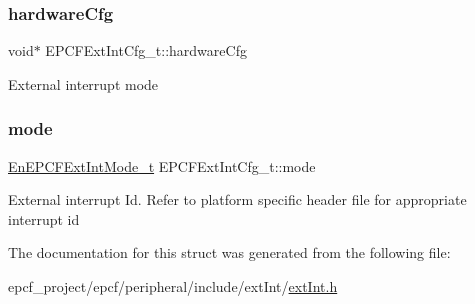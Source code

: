 \subsubsection{\texorpdfstring{hardware\+Cfg}{hardwareCfg}}
{\footnotesize\ttfamily void$\ast$ E\+P\+C\+F\+Ext\+Int\+Cfg\+\_\+t\+::hardware\+Cfg}

External interrupt mode \mbox{\label{structEPCFExtIntCfg__t_a0c4178dcdefa4b7386746928b63a586c}} 
\subsubsection{\texorpdfstring{mode}{mode}}
{\footnotesize\ttfamily \mbox{\hyperlink{extInt_8h_ad333fc40b8eb8a629c8ac27ad03b3245}{En\+E\+P\+C\+F\+Ext\+Int\+Mode\+\_\+t}} E\+P\+C\+F\+Ext\+Int\+Cfg\+\_\+t\+::mode}

External interrupt Id. Refer to platform specific header file for appropriate interrupt id 

The documentation for this struct was generated from the following file\+:\begin{DoxyCompactItemize}
\item 
epcf\+\_\+project/epcf/peripheral/include/ext\+Int/\mbox{\hyperlink{extInt_8h}{ext\+Int.\+h}}\end{DoxyCompactItemize}
